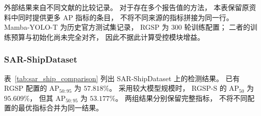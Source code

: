 \documentclass[journal]{IEEEtran}
\begin{document}
\begin{table}[!t]
\smallskip
\begin{minipage}{\linewidth}
\footnotesize
外部结果来自不同文献的比较记录。
对于存在多个报告值的方法，
本表保留原资料中同时提供更多 AP 指标的条目，
不将不同来源的指标拼接为同一行。
Mamba-YOLO-T 为历史官方测试集记录，
RGSP 为 300 轮训练配置；
二者的训练预算与初始化尚未完全对齐，
因此不据此计算受控模块增益。
\end{minipage}
\end{table}


\subsubsection{SAR-ShipDataset}
\label{sec:sar_ship_results}

表~\ref{tab:sar_ship_comparison}
列出 SAR-ShipDataset 上的检测结果。
已有 RGSP 配置的 AP$_{50:95}$ 为 $57.818\%$。
采用较大模型规模时，
RGSP-S 的 AP$_{50}$ 为 $95.609\%$，
但其 AP$_{50:95}$ 为 $53.177\%$。
两组结果分别保留完整指标，
不将不同配置的最优指标合并为同一结果。
\end{document}
